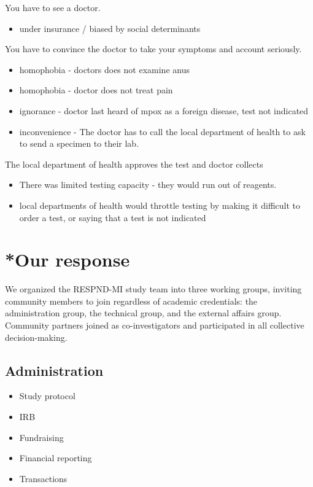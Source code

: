 \documentclass[
  letterpaper,
  DIV=11,
  numbers=noendperiod,
  oneside]{scrreprt}
\providecommand{\tightlist}{%
  \setlength{\itemsep}{0pt}\setlength{\parskip}{0pt}}\usepackage{longtable,booktabs,array}
\begin{document}
You have to see a doctor.

\begin{itemize}
\tightlist
\item
  under insurance / biased by social determinants
\end{itemize}

You have to convince the doctor to take your symptoms and account
seriously.

\begin{itemize}
\item
  homophobia - doctors does not examine anus
\item
  homophobia - doctor does not treat pain
\item
  ignorance - doctor last heard of mpox as a foreign disease, test not
  indicated
\item
  inconvenience - The doctor has to call the local department of health
  to ask to send a specimen to their lab.
\end{itemize}

The local department of health approves the test and doctor collects

\begin{itemize}
\item
  There was limited testing capacity - they would run out of reagents.
\item
  local departments of health would throttle testing by making it
  difficult to order a test, or saying that a test is not indicated
\end{itemize}

\hypertarget{our-response}{%
\chapter{*Our response}\label{our-response}}

We organized the RESPND-MI study team into three working groups,
inviting community members to join regardless of academic credentials:
the administration group, the technical group, and the external affairs
group. Community partners joined as co-investigators and participated in
all collective decision-making.

\hypertarget{administration}{%
\section{Administration}\label{administration}}

\begin{itemize}
\item
  Study protocol
\item
  IRB
\item
  Fundraising
\item
  Financial reporting
\item
  Transactions
\end{itemize}
\end{document}
